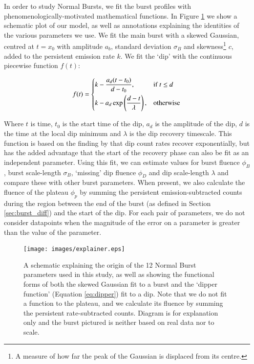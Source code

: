 \par In order to study Normal Bursts, we fit the burst profiles with phenomenologically-motivated mathematical functions.  In Figure \ref{fig:explain} we show a schematic plot of our model, as well as annotations explaining the identities of the various parameters we use.  We fit the main burst with a skewed Gaussian, centred at $t=x_0$ with amplitude $a_b$, standard deviation $\sigma_B$ and skewness\footnote{A measure of how far the peak of the Gaussian is displaced from its centre.} $c$, added to the persistent emission rate $k$.  We fit the `dip' with the continuous piecewise function $f(t)$:

\begin{equation}
f(t)=
\begin{dcases}
k-\frac{a_d(t-t_0)}{d-t_0}, & \text{if } t\leq d\\
k-a_d\exp\left(\frac{d-t}{\lambda}\right), & \text{otherwise}
\end{dcases}
\label{eq:dipper}
\end{equation}

Where $t$ is time, $t_0$ is the start time of the dip, $a_d$ is the amplitude of the dip, $d$ is the time at the local dip minimum and $\lambda$ is the dip recovery timescale.  This function is based on the finding by \citet{Younes_Expo} that dip count rates recover exponentially, but has the added advantage that the start of the recovery phase can also be fit as an independent parameter.  Using this fit, we can estimate values for burst fluence $\phi_B$, burst scale-length $\sigma_B$, `missing' dip fluence $\phi_D$ and dip scale-length $\lambda$ and compare these with other burst parameters.  When present, we also calculate the fluence of the plateau $\phi_p$ by summing the persistent emission-subtracted counts during the region between the end of the burst (as defined in Section \ref{sec:burst_diff}) and the start of the dip.  For each pair of parameters, we do not consider datapoints when the magnitude of the error on a parameter is greater than the value of the parameter.

\begin{figure}
  \centering
  \texttt{[image: images/explainer.eps]}
  \caption[A schematic explaining the origin of the 12 Normal Burst parameters used in this study.]{\small A schematic explaining the origin of the 12 Normal Burst parameters used in this study, as well as showing the functional forms of both the skewed Gaussian fit to a burst and the `dipper function' (Equation \ref{eq:dipper}) fit to a dip.  Note that we do not fit a function to the plateau, and we calculate its fluence by summing the persistent rate-subtracted counts.  Diagram is for explanation only and the burst pictured is neither based on real data nor to scale.}
  \label{fig:explain}
\end{figure}

